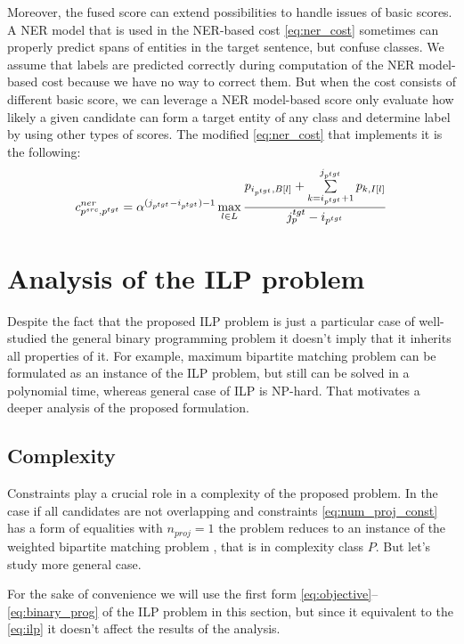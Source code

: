 Moreover, the fused score can extend possibilities to handle issues of basic scores.
A NER model that is used in the NER-based cost \eqref{eq:ner_cost} sometimes can properly
predict spans of entities in the target sentence, but confuse classes.
We assume that labels are predicted correctly during computation of the NER model-based cost because
we have no way to correct them. But when the cost consists of different basic score, we can leverage a
NER model-based score only evaluate how likely a given candidate can form a target entity of any class and
determine label by using other types of scores. The modified \eqref{eq:ner_cost} that implements it
is the following:
\begin{equation} \label{eq:ner_cost_wo_classes}
  c_{p^{src}, p^{tgt}}^{ner} = \alpha^{(j_{p^{tgt}} - i_{p^{tgt}}) - 1}
  \max\limits_{l \in L}
  \frac{
    p_{i_{p^{tgt}}, B[l]} +
    \sum\limits_{k = i_{p^{tgt}} + 1}^{j_{p^{tgt}}} p_{k, I[l]}
  }
  {j_p^{tgt} - i_{p^{tgt}}}
\end{equation}

\section{Analysis of the ILP problem}
Despite the fact that the proposed ILP problem is just a particular case
of well-studied the general binary programming problem it doesn't imply that
it inherits all properties of it. For example, maximum bipartite matching problem
can be formulated as an instance of the ILP problem, but still can be solved in a
polynomial time, whereas general case of ILP is NP-hard. That motivates a deeper analysis
of the proposed formulation.

\subsection{Complexity}
Constraints play a crucial role in a complexity of the proposed problem. In the case if all candidates are not overlapping and constraints
\eqref{eq:num_proj_const} has a form of equalities with \( n_{proj} = 1 \) the problem reduces to
an instance of the weighted bipartite matching problem \cite{pemmaraju2003computational}, that is in complexity class \( P \).
But let's study more general case.

For the sake of convenience we will use the first form \eqref{eq:objective}--\eqref{eq:binary_prog}
of the ILP problem in this section, but since it equivalent to the \eqref{eq:ilp} it doesn't affect
the results of the analysis.

